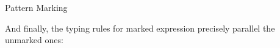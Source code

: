 \begin{mathpar}



   


  \end{mathpar}
  \caption{Pattern Marking}
  \label{fig:calculus-pattern-synthesis-marking}

And finally, the typing rules for marked expression precisely parallel the unmarked ones:

